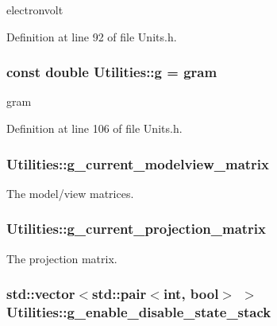 electronvolt 



Definition at line 92 of file Units.h.

\hypertarget{namespace_utilities_afa66a78e61dc36f0bf8236522c1d0495}{
\subsubsection[{g}]{\setlength{\rightskip}{0pt plus 5cm}const double {\bf Utilities::g} = {\bf gram}}}
\label{namespace_utilities_afa66a78e61dc36f0bf8236522c1d0495}


gram 



Definition at line 106 of file Units.h.

\hypertarget{namespace_utilities_accdb6ed1387ebfbb3458b12fc5104fc0}{
\subsubsection[{g\_\-current\_\-modelview\_\-matrix}]{ {\bf Utilities::g\_\-current\_\-modelview\_\-matrix}}}
\label{namespace_utilities_accdb6ed1387ebfbb3458b12fc5104fc0}


The model/view matrices. 

\hypertarget{namespace_utilities_a8c2454e701dfbb5ec835d7d3a36869c5}{
\subsubsection[{g\_\-current\_\-projection\_\-matrix}]{ {\bf Utilities::g\_\-current\_\-projection\_\-matrix}}}
\label{namespace_utilities_a8c2454e701dfbb5ec835d7d3a36869c5}


The projection matrix. 

\hypertarget{namespace_utilities_a12dfa64d0c2f8186e94336a73defa7a8}{
\subsubsection[{g\_\-enable\_\-disable\_\-state\_\-stack}]{\setlength{\rightskip}{0pt plus 5cm}std::vector$<$std::pair$<$int, bool$>$ $>$ {\bf Utilities::g\_\-enable\_\-disable\_\-state\_\-stack}}}
\label{namespace_utilities_a12dfa64d0c2f8186e94336a73defa7a8}


